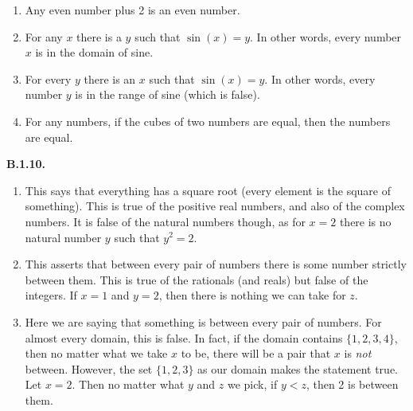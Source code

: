 \documentclass[10pt,]{book}
\theoremstyle{plain}
\theoremstyle{definition}
\theoremstyle{definition}
\theoremstyle{definition}
\theoremstyle{definition}
\numberwithin{equation}{chapter}
\newcommand{\lt}{<}
\begin{document}
\begin{enumerate}[label=(\alph*)]
\item\hypertarget{li-395}{}\hypertarget{p-1424}{}%
Any even number plus 2 is an even number.%
\item\hypertarget{li-396}{}\hypertarget{p-1425}{}%
For any \(x\) there is a \(y\) such that \(\sin(x) = y\). In other words, every number \(x\) is in the domain of sine.%
\item\hypertarget{li-397}{}\hypertarget{p-1426}{}%
For every \(y\) there is an \(x\) such that \(\sin(x) = y\). In other words, every number \(y\) is in the range of sine (which is false).%
\item\hypertarget{li-398}{}\hypertarget{p-1427}{}%
For any numbers, if the cubes of two numbers are equal, then the numbers are equal.%
\end{enumerate}
%
\par\smallskip
\noindent\textbf{B.1.10.} \hypertarget{p-1431}{}%
\leavevmode%
\begin{enumerate}[label=(\alph*)]
\item\hypertarget{li-402}{}\hypertarget{p-1432}{}%
This says that everything has a square root (every element is the square of something). This is true of the positive real numbers, and also of the complex numbers. It is false of the natural numbers though, as for \(x = 2\) there is no natural number \(y\) such that \(y^2 = 2\).%
\item\hypertarget{li-403}{}\hypertarget{p-1433}{}%
This asserts that between every pair of numbers there is some number strictly between them. This is true of the rationals (and reals) but false of the integers. If \(x = 1\) and \(y = 2\), then there is nothing we can take for \(z\).%
\item\hypertarget{li-404}{}\hypertarget{p-1434}{}%
Here we are saying that something is between every pair of numbers. For almost every domain, this is false. In fact, if the domain contains \(\{1,2,3, 4\}\), then no matter what we take \(x\) to be, there will be a pair that \(x\) is \emph{not} between. However, the set \(\{1,2,3\}\) as our domain makes the statement true. Let \(x = 2\). Then no matter what \(y\) and \(z\) we pick, if \(y \lt  z\), then 2 is between them.%
\end{enumerate}
%
\par\smallskip
\end{document}
